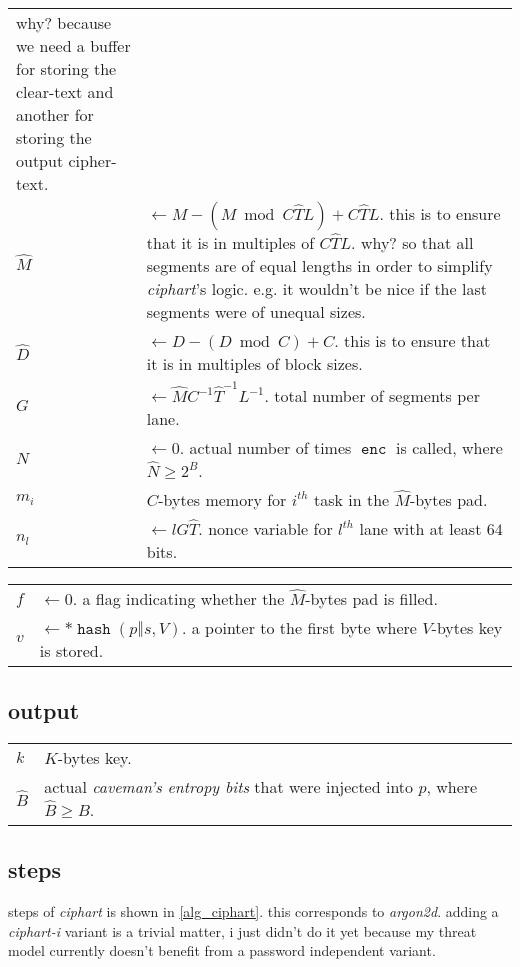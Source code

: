 \documentclass[twocolumn]{article}
\DeclareMathOperator{\enc}{\mathtt{enc}}
\DeclareMathOperator{\hash}{\mathtt{hash}}
\begin{document}
\begin{tabularx}{\columnwidth}{lX}
                    why?  because we need a buffer for storing the
                    clear-text and another for storing the output
                    cipher-text.\\
    $\hat M$    & $\gets M - (M \bmod C\hat TL) + C\hat TL$.  this is to
                    ensure that it is in multiples of $C\hat TL$.  why?  so
                    that all segments are of equal lengths in order to
                    simplify \emph{ciphart}'s logic.  e.g. it wouldn't be
                    nice if the last segments were of unequal sizes.\\
    $\hat D$    & $\gets D - (D \bmod C) + C$.  this is to
                    ensure that it is in multiples of block sizes.\\
    $G$         & $\gets \hat MC^{-1}\hat T^{-1}L^{-1}$.  total number of
                    segments per lane.\\
    $N$    & $\gets 0$.  actual number of times $\enc$ is called,
                    where $\hat N \ge 2^B$.\\
    $m_i$       & $C$-bytes memory for $i^{th}$ task in the $\hat M$-bytes
                    pad.\\
    $n_l$       & $\gets lG\hat T$.  nonce variable for $l^{th}$ lane with
                    at least $64$ bits.\\
\end{tabularx}
\begin{tabularx}{\columnwidth}{lX}
    $f$         & $\gets 0$.  a flag indicating whether the $\hat M$-bytes
                    pad is filled.\\
    $v$         & $\gets *\hash(p \mathbin\Vert s, V)$.  a pointer to the
                    first byte where $V$-bytes key is stored.\\
\end{tabularx}

\subsection{output}
\begin{tabularx}{\columnwidth}{lX}
$k$ & $K$-bytes key.\\
$\hat B$ & actual \emph{caveman's entropy bits} that were injected into
            $p$, where $\hat B \ge B$.\\
\end{tabularx}

\subsection{steps}
steps of \emph{ciphart} is shown in \cref{alg_ciphart}.  this corresponds
to \emph{argon2d}.  adding a \emph{ciphart-i} variant is a trivial matter,
i just didn't do it yet because my threat model currently doesn't benefit
from a password independent variant.
\end{document}
